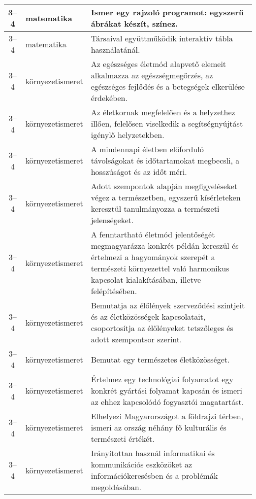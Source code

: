 \begin{small}
\begin{longtable}{c | p{2cm} |  p{11cm} }
              3--4 & matematika & Ismer egy rajzoló programot: egyszerű ábrákat készít, színez.
 \\ \hline
              3--4 & matematika & Társaival együttműködik interaktív tábla használatánál. \\ \hline
              3--4 & környezet\-ismeret & Az egészséges életmód alapvető elemeit alkalmazza az egészségmegőrzés, az egészséges fejlődés és a betegségek elkerülése érdekében. \\ \hline
              3--4 & környezet\-ismeret & Az életkornak megfelelően és a helyzethez illően, felelősen viselkedik a segítségnyújtást igénylő helyzetekben. \\ \hline
              3--4 & környezet\-ismeret & A mindennapi életben előforduló távolságokat és időtartamokat megbecsli, a hosszúságot és az időt méri. \\ \hline
              3--4 & környezet\-ismeret & Adott szempontok alapján megfigyeléseket végez a természetben, egyszerű kísérleteken keresztül tanulmányozza a természeti jelenségeket. \\ \hline
              3--4 & környezet\-ismeret & A fenntartható életmód jelentőségét megmagyarázza konkrét példán kereszül és értelmezi a hagyományok szerepét a természeti környezettel való harmonikus kapcsolat kialakításában, illetve felépítésében. \\ \hline
              3--4 & környezet\-ismeret & Bemutatja az élőlények szerveződési szintjeit és az életközösségek kapcsolatait, csoportosítja az élőlényeket tetszőleges és adott szempontsor szerint. \\ \hline
              3--4 & környezet\-ismeret & Bemutat egy természetes életközösséget. \\ \hline
              3--4 & környezet\-ismeret & Értelmez egy technológiai folyamatot egy konkrét gyártási folyamat kapcsán és ismeri az ehhez kapcsolódó fogyasztói magatartást. \\ \hline
              3--4 & környezet\-ismeret & Elhelyezi Magyarországot a földrajzi térben, ismeri az ország néhány fő kulturális és természeti értékét. \\ \hline
              3--4 & környezet\-ismeret & Irányítottan használ informatikai és kommunikációs eszközöket az információkeresésben és a problémák megoldásában. \\ \hline
      \end{longtable}
\end{small}


